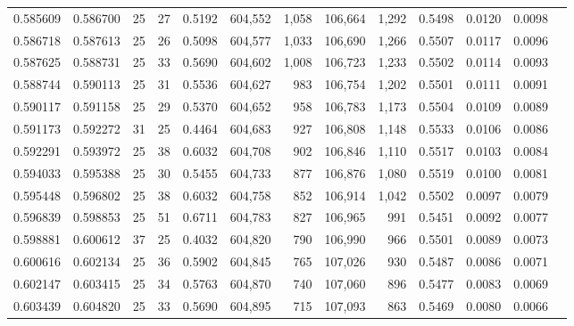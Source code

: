 \begin{tabular}{rrrrrrrrrrrrr}
0.585609 & 0.586700 &    25 &  27 &                                     0.5192 & 604,552 &   1,058 & 106,664 &   1,292 & 0.5498 & 0.0120 & 0.0098 \\
0.586718 & 0.587613 &    25 &  26 &                                     0.5098 & 604,577 &   1,033 & 106,690 &   1,266 & 0.5507 & 0.0117 & 0.0096 \\
0.587625 & 0.588731 &    25 &  33 &                                     0.5690 & 604,602 &   1,008 & 106,723 &   1,233 & 0.5502 & 0.0114 & 0.0093 \\
0.588744 & 0.590113 &    25 &  31 &                                     0.5536 & 604,627 &     983 & 106,754 &   1,202 & 0.5501 & 0.0111 & 0.0091 \\
0.590117 & 0.591158 &    25 &  29 &                                     0.5370 & 604,652 &     958 & 106,783 &   1,173 & 0.5504 & 0.0109 & 0.0089 \\
0.591173 & 0.592272 &    31 &  25 &                                     0.4464 & 604,683 &     927 & 106,808 &   1,148 & 0.5533 & 0.0106 & 0.0086 \\
0.592291 & 0.593972 &    25 &  38 &                                     0.6032 & 604,708 &     902 & 106,846 &   1,110 & 0.5517 & 0.0103 & 0.0084 \\
0.594033 & 0.595388 &    25 &  30 &                                     0.5455 & 604,733 &     877 & 106,876 &   1,080 & 0.5519 & 0.0100 & 0.0081 \\
0.595448 & 0.596802 &    25 &  38 &                                     0.6032 & 604,758 &     852 & 106,914 &   1,042 & 0.5502 & 0.0097 & 0.0079 \\
0.596839 & 0.598853 &    25 &  51 &                                     0.6711 & 604,783 &     827 & 106,965 &     991 & 0.5451 & 0.0092 & 0.0077 \\
0.598881 & 0.600612 &    37 &  25 &                                     0.4032 & 604,820 &     790 & 106,990 &     966 & 0.5501 & 0.0089 & 0.0073 \\
0.600616 & 0.602134 &    25 &  36 &                                     0.5902 & 604,845 &     765 & 107,026 &     930 & 0.5487 & 0.0086 & 0.0071 \\
0.602147 & 0.603415 &    25 &  34 &                                     0.5763 & 604,870 &     740 & 107,060 &     896 & 0.5477 & 0.0083 & 0.0069 \\
0.603439 & 0.604820 &    25 &  33 &                                     0.5690 & 604,895 &     715 & 107,093 &     863 & 0.5469 & 0.0080 & 0.0066 \\

\end{tabular}
